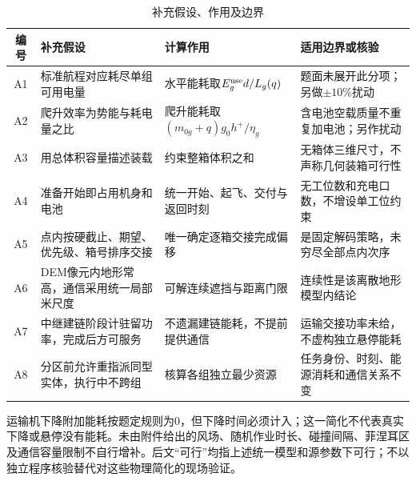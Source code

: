 \documentclass[a4paper]{my_paper}%
\numberwithin{equation}{section}
\theoremstyle{definition}
\begin{document}
\begin{table}[htbp]\centering\small
\caption{补充假设、作用及边界}\label{tab:assumptions}
\begin{tabularx}{\linewidth}{@{}cP{.24\linewidth}YY@{}}\toprule
编号 & 补充假设 & 计算作用 & 适用边界或核验\\\midrule
A1 & 标准航程对应耗尽单组可用电量 & 水平能耗取$E_g^{\rm use}d/L_g(q)$ & 题面未展开此分项；另做$\pm10\%$扰动\\
A2 & 爬升效率为势能与耗电量之比 & 爬升能耗取$(m_{0g}+q)g_0h^+/\eta_g$ & 含电池空载质量不重复加电池；另作扰动\\
A3 & 用总体积容量描述装载 & 约束整箱体积之和 & 无箱体三维尺寸，不声称几何装箱可行性\\
A4 & 准备开始即占用机身和电池 & 统一开始、起飞、交付与返回时刻 & 无工位数和充电口数，不增设单工位约束\\
A5 & 点内按硬截止、期望、优先级、箱号排序交接 & 唯一确定逐箱交接完成偏移 & 是固定解码策略，未穷尽全部点内次序\\
A6 & DEM像元内地形常高，通信采用统一局部米尺度 & 可解连续遮挡与距离门限 & 连续性是该离散地形模型内结论\\
A7 & 中继建链阶段计驻留功率，完成后方可服务 & 不遗漏建链能耗，不提前提供通信 & 运输交接功率未给，不虚构独立悬停能耗\\
A8 & 分区前允许重指派同型实体，执行中不跨组 & 核算各组独立最少资源 & 任务身份、时刻、能源消耗和通信关系不变\\\bottomrule
\end{tabularx}
\end{table}

运输机下降附加能耗按题定规则为0，但下降时间必须计入；这一简化不代表真实下降或悬停没有能耗。未由附件给出的风场、随机作业时长、碰撞间隔、菲涅耳区及通信容量限制不自行增补。后文“可行”均指上述统一模型和源参数下可行；不以独立程序核验替代对这些物理简化的现场验证。
\end{document}
